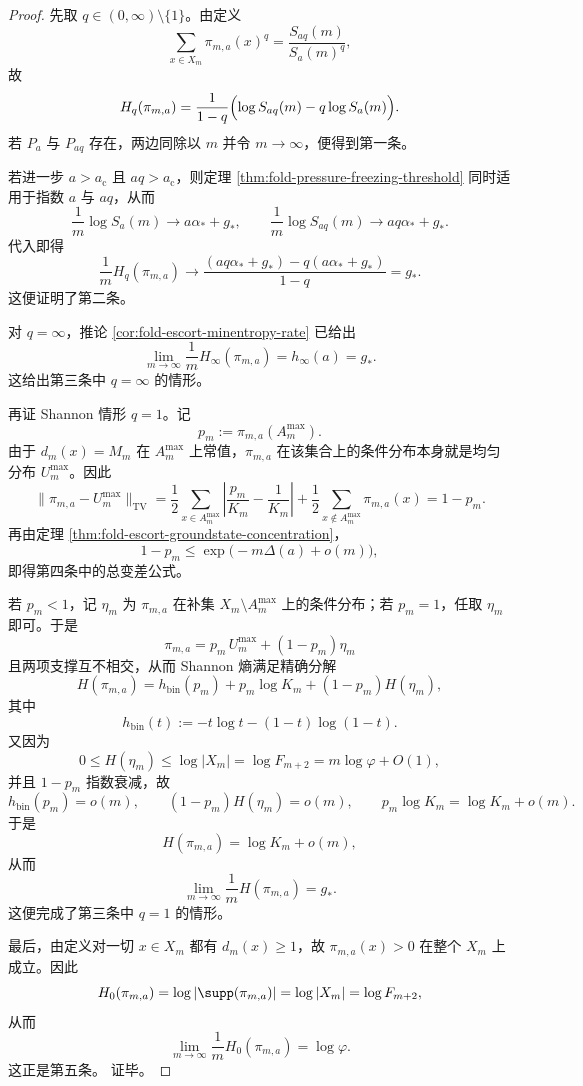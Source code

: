 \begin{proof}
先取 \(q\in(0,\infty)\setminus\{1\}\)。由定义
\[
\sum_{x\in X_m}\pi_{m,a}(x)^q
=
\frac{S_{aq}(m)}{S_a(m)^q},
\]
故
\[
H_q(\pi_{m,a})
=
\frac{1}{1-q}\Bigl(\log S_{aq}(m)-q\log S_a(m)\Bigr).
\]
若 \(P_a\) 与 \(P_{aq}\) 存在，两边同除以 \(m\) 并令 \(m\to\infty\)，便得到第一条。

若进一步 \(a>a_{\mathrm c}\) 且 \(aq>a_{\mathrm c}\)，则定理 \ref{thm:fold-pressure-freezing-threshold} 同时适用于指数 \(a\) 与 \(aq\)，从而
\[
\frac1m\log S_a(m)\to a\alpha_*+g_*,
\qquad
\frac1m\log S_{aq}(m)\to aq\alpha_*+g_*.
\]
代入即得
\[
\frac1m H_q(\pi_{m,a})
\to
\frac{(aq\alpha_*+g_*)-q(a\alpha_*+g_*)}{1-q}
=
g_*.
\]
这便证明了第二条。
\par
对 \(q=\infty\)，推论 \ref{cor:fold-escort-minentropy-rate} 已给出
\[
\lim_{m\to\infty}\frac1m H_\infty(\pi_{m,a})=h_\infty(a)=g_*.
\]
这给出第三条中 \(q=\infty\) 的情形。
\par
再证 Shannon 情形 \(q=1\)。记
\[
p_m:=\pi_{m,a}(A_m^{\max}).
\]
由于 \(d_m(x)=M_m\) 在 \(A_m^{\max}\) 上常值，\(\pi_{m,a}\) 在该集合上的条件分布本身就是均匀分布 \(U_m^{\max}\)。因此
\[
\|\pi_{m,a}-U_m^{\max}\|_{\mathrm{TV}}
=
\frac12\sum_{x\in A_m^{\max}}\left|\frac{p_m}{K_m}-\frac1{K_m}\right|
+\frac12\sum_{x\notin A_m^{\max}}\pi_{m,a}(x)
=
1-p_m.
\]
再由定理 \ref{thm:fold-escort-groundstate-concentration}，
\[
1-p_m\le \exp\!\bigl(-m\Delta(a)+o(m)\bigr),
\]
即得第四条中的总变差公式。
\par
若 \(p_m<1\)，记 \(\eta_m\) 为 \(\pi_{m,a}\) 在补集 \(X_m\setminus A_m^{\max}\) 上的条件分布；若 \(p_m=1\)，任取 \(\eta_m\) 即可。于是
\[
\pi_{m,a}=p_m\,U_m^{\max}+(1-p_m)\eta_m
\]
且两项支撑互不相交，从而 Shannon 熵满足精确分解
\[
H(\pi_{m,a})
=
h_{\mathrm{bin}}(p_m)+p_m\log K_m+(1-p_m)H(\eta_m),
\]
其中
\[
h_{\mathrm{bin}}(t):=-t\log t-(1-t)\log(1-t).
\]
又因为
\[
0\le H(\eta_m)\le \log|X_m|=\log F_{m+2}=m\log\varphi+O(1),
\]
并且 \(1-p_m\) 指数衰减，故
\[
h_{\mathrm{bin}}(p_m)=o(m),
\qquad
(1-p_m)H(\eta_m)=o(m),
\qquad
p_m\log K_m=\log K_m+o(m).
\]
于是
\[
H(\pi_{m,a})=\log K_m+o(m),
\]
从而
\[
\lim_{m\to\infty}\frac1m H(\pi_{m,a})=g_*.
\]
这便完成了第三条中 \(q=1\) 的情形。
\par
最后，由定义对一切 \(x\in X_m\) 都有 \(d_m(x)\ge 1\)，故 \(\pi_{m,a}(x)>0\) 在整个 \(X_m\) 上成立。因此
\[
H_0(\pi_{m,a})=\log|\supp(\pi_{m,a})|=\log|X_m|=\log F_{m+2},
\]
从而
\[
\lim_{m\to\infty}\frac1m H_0(\pi_{m,a})=\log\varphi.
\]
这正是第五条。
证毕。
\end{proof}



